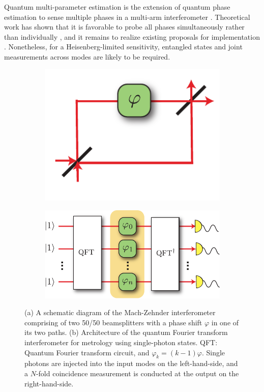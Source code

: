 \documentclass[times,final]{elsarticle}
\begin{document}
 Quantum multi-parameter estimation is the extension of quantum phase estimation to sense multiple phases in a multi-arm interferometer \cite{bib:Szczykulska16}. Theoretical work has shown that it is favorable to probe all phases simultaneously rather than individually \cite{bib:Baumgratz16,bib:Ciampini16}, and it remains to realize existing proposals for implementation \cite{bib:Spagnolo12}. Nonetheless, for a Heisenberg-limited sensitivity, entangled states and joint measurements across modes are likely to be required. 
 
\begin{figure}
\centering
\begin{subfigure}{.5\columnwidth}
  \centering
  \includegraphics[width=0.5\columnwidth]{phE}
  \caption{}
   \label{fig:MZ}
\end{subfigure}%
\begin{subfigure}{0.5\columnwidth}
  \centering
  \includegraphics[width=0.8\columnwidth]{MORDOR}
  \caption{}
  \label{fig:MORDOR}
\end{subfigure}
\caption{(a) A schematic diagram of the Mach-Zehnder interferometer comprising of two 50/50 beamsplitters with a phase shift $\varphi$ in one of its two paths.	(b) Architecture of the quantum Fourier transform interferometer for metrology using single-photon states. QFT: Quantum Fourier transform circuit, and $\varphi_k=(k-1)\varphi$. Single photons are injected into the input modes on the left-hand-side, and a $N$-fold coincidence measurement is conducted at the output on the right-hand-side.}
\end{figure}
\end{document}
